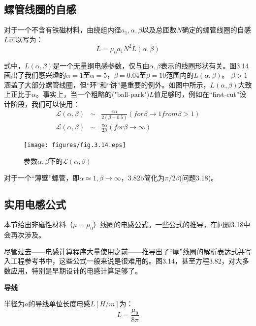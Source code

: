 \subsection{螺管线圈的自感}
对于一个不含有铁磁材料，由绕组内径$a_1,\alpha,\beta$以及总匝数$N$确定的螺管线圈的自感$L$可以写为：
\begin{equation}
L=\mu_0a_1N^2L(\alpha,\beta)%
\end{equation}

式中，$L(\alpha,\beta)$是一个无量纲电感参数，仅与由$\alpha,\beta$表示的线圈形状有关。图3.14画出了我们感兴趣的$\alpha=1$至$\alpha=5$，$\beta=0.04$至$\beta=10$范围内的$L(\alpha,\beta)$。
$\beta>1$涵盖了大部分螺管线圈，但“环”和“饼”是重要的例外。如图中所示，$L(\alpha,\beta)$大致上正比于$\alpha$。事实上，当一个粗略的("ball-park")$L$值足够时，例如在“first-cut”设计阶段，我们可以使用：
\begin{eqnarray}
\mathcal{L}(\alpha,\beta)&\sim&\frac{\pi\alpha}{2(\beta+0.5)} (for \beta\rightarrow 1 from \beta>1)\\ %
\mathcal{L}(\alpha,\beta)&\sim&\frac{\pi\alpha}{2\beta} (for \beta\rightarrow \infty)%
\end{eqnarray}

\begin{figure}[htbp]
  \centering
 \texttt{[image: figures/fig.3.14.eps]}
  \caption{参数$\alpha,\beta$下的$\mathcal{L}(\alpha,\beta)$}
\end{figure}

对于一个“薄壁”螺管，即$\alpha\simeq 1,\beta\rightarrow \infty$，3.82b简化为$\pi/2\beta$(问题3.18)。

\subsection{实用电感公式}
本节给出非磁性材料（$\mu=\mu_0$）线圈的电感公式。一些公式的推导，在问题3.18中会再次涉及。

尽管过去——电感计算程序大量使用之前——推导出了“厚”线圈的解析表达式并写入工程参考书中，这些公式一般来说是很难用的。图3.14，甚至方程3.82，对大多数应用，特别是早期设计的电感计算足够了。


\textbf{导线}  
  
  半径为$a$的导线单位长度电感$L[H/m]$为：
  \begin{equation}
         L=\frac{\mu_0}{8\pi}%
  \end{equation}
  
